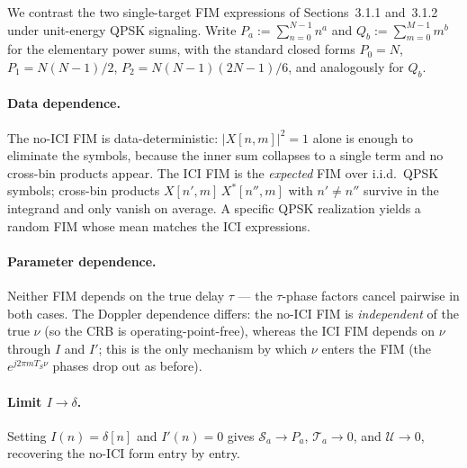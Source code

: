 \documentclass[11pt]{article}
\begin{document}
We contrast the two single-target FIM expressions of Sections~3.1.1 and~3.1.2 under unit-energy QPSK signaling. Write \(P_a := \sum_{n=0}^{N-1} n^a\) and \(Q_b := \sum_{m=0}^{M-1} m^b\) for the elementary power sums, with the standard closed forms \(P_0 = N\), \(P_1 = N(N-1)/2\), \(P_2 = N(N-1)(2N-1)/6\), and analogously for \(Q_b\).

\paragraph{Data dependence.} The no-ICI FIM is data-deterministic: \(|X[n,m]|^2 = 1\) alone is enough to eliminate the symbols, because the inner sum collapses to a single term and no cross-bin products appear. The ICI FIM is the \emph{expected} FIM over i.i.d.\ QPSK symbols; cross-bin products \(X[n',m]\, X^*[n'',m]\) with \(n' \neq n''\) survive in the integrand and only vanish on average. A specific QPSK realization yields a random FIM whose mean matches the ICI expressions.

\paragraph{Parameter dependence.} Neither FIM depends on the true delay \(\tau\) — the \(\tau\)-phase factors cancel pairwise in both cases. The Doppler dependence differs: the no-ICI FIM is \emph{independent} of the true \(\nu\) (so the CRB is operating-point-free), whereas the ICI FIM depends on \(\nu\) through \(I\) and \(I'\); this is the only mechanism by which \(\nu\) enters the FIM (the \(e^{j2\pi mT_S\nu}\) phases drop out as before).

\paragraph{Limit \(I \to \delta\).} Setting \(I(n) = \delta[n]\) and \(I'(n) = 0\) gives \(\mathcal{S}_a \to P_a\), \(\mathcal{T}_a \to 0\), and \(\mathcal{U} \to 0\), recovering the no-ICI form entry by entry.
\end{document}
